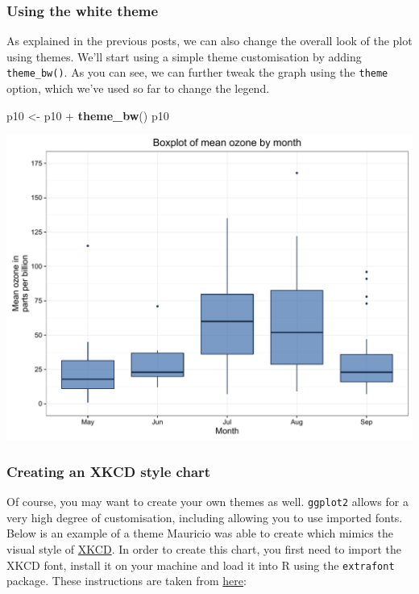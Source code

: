 \documentclass[]{article}
\newenvironment{Shaded}{\begin{snugshade}}{\end{snugshade}}
\newcommand{\KeywordTok}[1]{\textcolor[rgb]{0.13,0.29,0.53}{\textbf{{#1}}}}
\newcommand{\StringTok}[1]{\textcolor[rgb]{0.31,0.60,0.02}{{#1}}}
\newcommand{\NormalTok}[1]{{#1}}
\begin{document}
\subsubsection{Using the white theme}\label{using-the-white-theme-9}

As explained in the previous posts, we can also change the overall look
of the plot using themes. We'll start using a simple theme customisation
by adding \texttt{theme\_bw()}. As you can see, we can further tweak the
graph using the \texttt{theme} option, which we've used so far to change
the legend.

\begin{Shaded}
\begin{Highlighting}[]
\NormalTok{p10 <-}\StringTok{ }\NormalTok{p10 +}\StringTok{ }\KeywordTok{theme_bw}\NormalTok{()}
\NormalTok{p10}
\end{Highlighting}
\end{Shaded}

\begin{center}\includegraphics{0_all_posts_pdf/box_10-1} \end{center}

\subsubsection{Creating an XKCD style
chart}\label{creating-an-xkcd-style-chart-9}

Of course, you may want to create your own themes as well.
\texttt{ggplot2} allows for a very high degree of customisation,
including allowing you to use imported fonts. Below is an example of a
theme Mauricio was able to create which mimics the visual style of
\href{http://xkcd.com/}{XKCD}. In order to create this chart, you first
need to import the XKCD font, install it on your machine and load it
into R using the \texttt{extrafont} package. These instructions are
taken from
\href{https://www.google.com.au/url?sa=t\&rct=j\&q=\&esrc=s\&source=web\&cd=1\&ved=0ahUKEwiWzafchdPJAhVBpJQKHe_LDT8QFggbMAA\&url=https\%3A\%2F\%2Fcran.r-project.org\%2Fweb\%2Fpackages\%2Fxkcd\%2Fvignettes\%2Fxkcd-intro.pdf\&usg=AFQjCNE-KciGY14e-Q1buYIVmTFC0ht__Q\&sig2=DZUwkvIHwfNWtTtkcz94jg}{here}:
\end{document}
